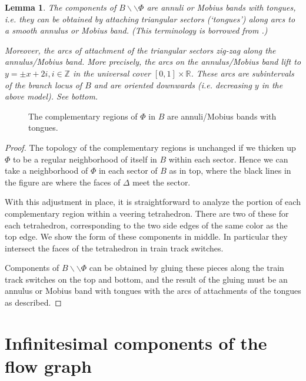 \documentclass[12pt]{amsart}
\newtheorem{lemma}[thm]{Lemma}
\theoremstyle{definition}
\numberwithin{equation}{section}
\begin{document}
\begin{lemma} \label{lemma:flowgraphcompl}
The components of $B \backslash \backslash \Phi$ are annuli or Mobius bands with tongues, i.e. they can be obtained by attaching triangular sectors (`tongues') along arcs to a smooth annulus or Mobius band. (This terminology is borrowed from \cite{Mos96}.)

Moreover, the arcs of attachment of the triangular sectors zig-zag along the annulus/Mobius band. More precisely, the arcs on the annulus/Mobius band lift to $y=\pm x + 2i, i \in \mathbb{Z}$ in the universal cover $[0,1] \times \mathbb{R}$. These arcs are subintervals of the branch locus of $B$ and are oriented downwards (i.e. decreasing $y$ in the above model). See  bottom.
\end{lemma}

\begin{figure}
    \centering
    \resizebox{!}{12cm}{}
    \caption{The complementary regions of $\Phi$ in $B$ are annuli/Mobius bands with tongues.}
    \label{fig:flowgraphcompl}
\end{figure}

\begin{proof}
The topology of the complementary regions is unchanged if we thicken up $\Phi$ to be a regular neighborhood of itself in $B$ within each sector. Hence we can take a neighborhood of $\Phi$ in each sector of $B$ as in  top, where the black lines in the figure are where the faces of $\Delta$ meet the sector.

With this adjustment in place, it is straightforward to analyze the portion of each complementary region within a veering tetrahedron. There are two of these for each tetrahedron, corresponding to the two side edges of the same color as the top edge. We show the form of these components in  middle. In particular they intersect the faces of the tetrahedron in train track switches. 

Components of $B \backslash \backslash \Phi$ can be obtained by gluing these pieces along the train track switches on the top and bottom, and the result of the gluing must be an annulus or Mobius band with tongues with the arcs of attachments of the tongues as described.
\end{proof}

\section{Infinitesimal components of the flow graph} \label{sec:infcomp}
\end{document}
